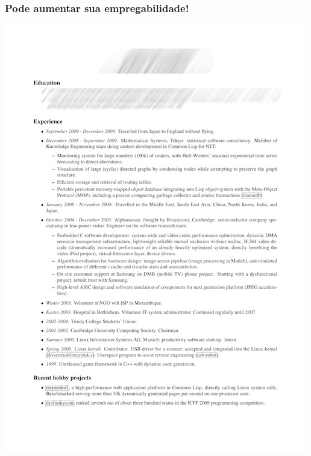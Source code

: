 \documentclass[xcolor=dvipsnames]{beamer}
\begin{document}
\begin{frame}
	\frametitle{Pode aumentar sua empregabilidade!}
 	\includegraphics[scale=0.75]{example_CV.jpg}
\end{frame}
\end{document}
